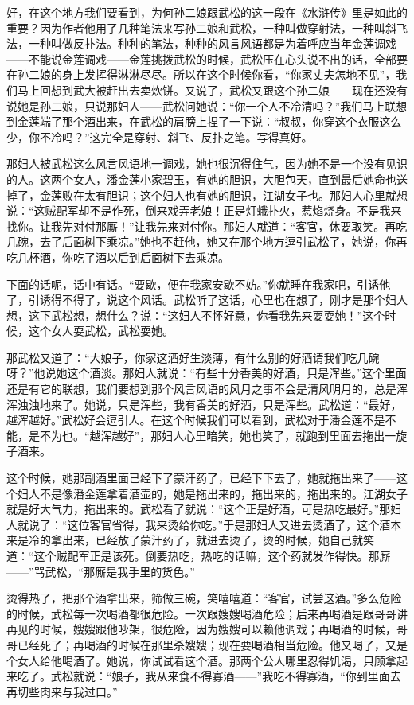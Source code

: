 \par 好，在这个地方我们要看到，为何孙二娘跟武松的这一段在《水浒传》里是如此的重要？因为作者他用了几种笔法来写孙二娘和武松，一种叫做穿射法，一种叫斜飞法，一种叫做反扑法。种种的笔法，种种的风言风语都是为着呼应当年金莲调戏——不能说金莲调戏——金莲挑拨武松的时候，武松压在心头说不出的话，全部要在孙二娘的身上发挥得淋淋尽尽。所以在这个时候你看，“你家丈夫怎地不见”，我们马上回想到武大被赶出去卖炊饼。又说了，武松又跟这个孙二娘——现在还没有说她是孙二娘，只说那妇人——武松问她说：“你一个人不冷清吗？”我们马上联想到金莲端了那个酒出来，在武松的肩膀上捏了一下说：“叔叔，你穿这个衣服这么少，你不冷吗？”这完全是穿射、斜飞、反扑之笔。写得真好。
\par 那妇人被武松这么风言风语地一调戏，她也很沉得住气，因为她不是一个没有见识的人。这两个女人，潘金莲小家碧玉，有她的胆识，大胆包天，直到最后她命也送掉了，金莲败在太有胆识；这个妇人也有她的胆识，江湖女子也。那妇人心里就想说：“这贼配军却不是作死，倒来戏弄老娘！正是灯蛾扑火，惹焰烧身。不是我来找你。让我先对付那厮！”让我先来对付你。那妇人就道：“客官，休要取笑。再吃几碗，去了后面树下乘凉。”她也不赶他，她又在那个地方逗引武松了，她说，你再吃几杯酒，你吃了酒以后到后面树下去乘凉。
\par 下面的话呢，话中有话。“要歇，便在我家安歇不妨。”你就睡在我家吧，引诱他了，引诱得不得了，说这个风话。武松听了这话，心里也在想了，刚才是那个妇人想，这下武松想，想什么？说：“这妇人不怀好意，你看我先来耍耍她！”这个时候，这个女人耍武松，武松耍她。
\par 那武松又道了：“大娘子，你家这酒好生淡薄，有什么别的好酒请我们吃几碗呀？”他说她这个酒淡。那妇人就说：“有些十分香美的好酒，只是浑些。”这个里面还是有它的联想，我们要想到那个风言风语的风月之事不会是清风明月的，总是浑浑浊浊地来了。她说，只是浑些，我有香美的好酒，只是浑些。武松道：“最好，越浑越好。”武松好会逗引人。在这个时候我们可以看到，武松对于潘金莲不是不能，是不为也。“越浑越好”，那妇人心里暗笑，她也笑了，就跑到里面去拖出一旋子酒来。
\par 这个时候，她那副酒里面已经下了蒙汗药了，已经下下去了，她就拖出来了——这个妇人不是像潘金莲拿着酒壶的，她是拖出来的，拖出来的，拖出来的。江湖女子就是好大气力，拖出来的。武松看了就说：“这个正是好酒，可是热吃最好。”那妇人就说了：“这位客官省得，我来烫给你吃。”于是那妇人又进去烫酒了，这个酒本来是冷的拿出来，已经放了蒙汗药了，就进去烫了，烫的时候，她自己就笑道：“这个贼配军正是该死。倒要热吃，热吃的话嘛，这个药就发作得快。那厮——”骂武松，“那厮是我手里的货色。”
\par 烫得热了，把那个酒拿出来，筛做三碗，笑嘻嘻道：“客官，试尝这酒。”多么危险的时候，武松每一次喝酒都很危险。一次跟嫂嫂喝酒危险；后来再喝酒是跟哥哥讲再见的时候，嫂嫂跟他吵架，很危险，因为嫂嫂可以赖他调戏；再喝酒的时候，哥哥已经死了；再喝酒的时候在那里杀嫂嫂；现在要喝酒相当危险。他又喝了，又是个女人给他喝酒了。她说，你试试看这个酒。那两个公人哪里忍得饥渴，只顾拿起来吃了。武松就说：“娘子，我从来食不得寡酒——”我吃不得寡酒，“你到里面去再切些肉来与我过口。”
